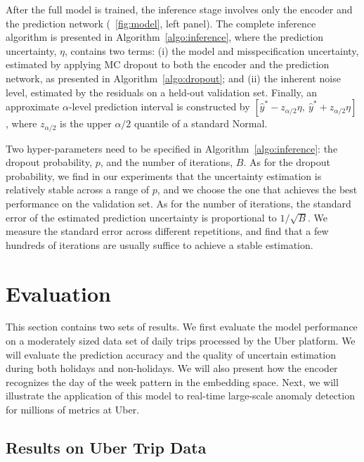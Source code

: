 \documentclass[conference,compsoc,final]{IEEEtran}
\begin{document}
After the full model is trained, the inference stage involves only the encoder and the prediction network (\figurename~\ref{fig:model}, left panel). The complete inference algorithm is presented in Algorithm~\ref{algo:inference}, where the prediction uncertainty, $\eta$, contains two terms: (i) the model and misspecification uncertainty, estimated by applying MC dropout to both the encoder and the prediction network, as presented in Algorithm~\ref{algo:dropout}; and (ii) the inherent noise level, estimated by the residuals on a held-out validation set. Finally, an approximate $\alpha$-level prediction interval is constructed by $[\hat{y}^* - z_{\alpha/2} \eta, ~ \hat{y}^* + z_{\alpha/2} \eta]$, where $z_{\alpha/2}$ is the upper $\alpha/2$ quantile of a standard Normal.



Two hyper-parameters need to be specified in Algorithm~\ref{algo:inference}: the dropout probability, $p$, and the number of iterations, $B$. As for the dropout probability, we find in our experiments that the uncertainty estimation is relatively stable across a range of $p$, and we choose the one that achieves the best performance on the validation set. As for the number of iterations, the standard error of the estimated prediction uncertainty is proportional to $1/\sqrt{B}$. We measure the standard error across different repetitions, and find that a few hundreds of iterations are usually suffice to achieve a stable estimation.





 


\section{Evaluation}
\label{sec:evaluation}

This section contains two sets of results. We first evaluate the model performance on a moderately sized data set of daily trips 
processed by the Uber platform.
We will evaluate the prediction accuracy and the quality of uncertain estimation during both holidays and non-holidays. We will also present how the encoder recognizes the day of the week pattern in the embedding space. Next, we will illustrate the application of this model to real-time large-scale anomaly detection for millions of metrics at Uber. 

\subsection{Results on 
Uber 
Trip Data}
\label{sec:trip}
\end{document}
